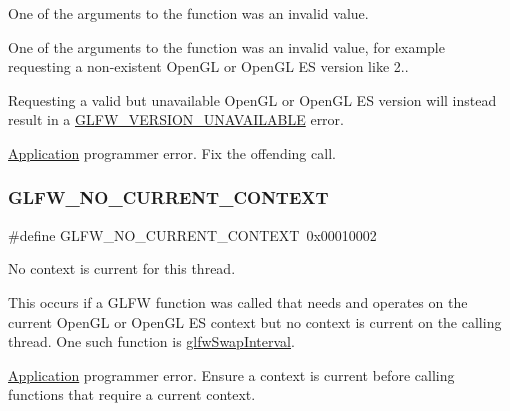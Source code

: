 One of the arguments to the function was an invalid value. 

One of the arguments to the function was an invalid value, for example requesting a non-\/existent Open\+GL or Open\+GL ES version like 2..

Requesting a valid but unavailable Open\+GL or Open\+GL ES version will instead result in a \hyperlink{group__errors_gad16c5565b4a69f9c2a9ac2c0dbc89462}{G\+L\+F\+W\+\_\+\+V\+E\+R\+S\+I\+O\+N\+\_\+\+U\+N\+A\+V\+A\+I\+L\+A\+B\+LE} error.

\hyperlink{classApplication}{Application} programmer error. Fix the offending call. \mbox{\label{group__errors_gaa8290386e9528ccb9e42a3a4e16fc0d0}} 
\subsubsection{\texorpdfstring{G\+L\+F\+W\+\_\+\+N\+O\+\_\+\+C\+U\+R\+R\+E\+N\+T\+\_\+\+C\+O\+N\+T\+E\+XT}{GLFW\_NO\_CURRENT\_CONTEXT}\hspace{0.1cm}{\footnotesize\ttfamily [1/5]}}
{\footnotesize\ttfamily \#define G\+L\+F\+W\+\_\+\+N\+O\+\_\+\+C\+U\+R\+R\+E\+N\+T\+\_\+\+C\+O\+N\+T\+E\+XT~0x00010002}



No context is current for this thread. 

This occurs if a G\+L\+FW function was called that needs and operates on the current Open\+GL or Open\+GL ES context but no context is current on the calling thread. One such function is \hyperlink{group__context_ga12a595c06947cec4967c6e1f14210a8a}{glfw\+Swap\+Interval}.

\hyperlink{classApplication}{Application} programmer error. Ensure a context is current before calling functions that require a current context. \mbox{\label{group__errors_gaa8290386e9528ccb9e42a3a4e16fc0d0}} 
